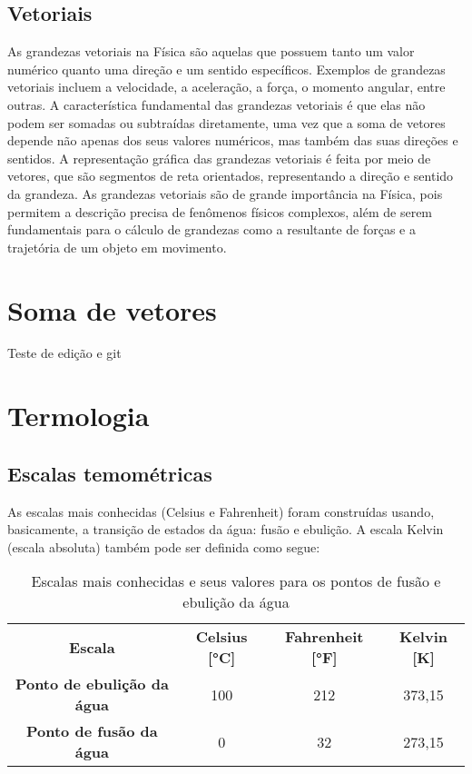 \subsection{Vetoriais}
As grandezas vetoriais na Física são aquelas que possuem tanto um valor numérico quanto uma direção e um sentido específicos. Exemplos de grandezas vetoriais incluem a velocidade, a aceleração, a força, o momento angular, entre outras. A característica fundamental das grandezas vetoriais é que elas não podem ser somadas ou subtraídas diretamente, uma vez que a soma de vetores depende não apenas dos seus valores numéricos, mas também das suas direções e sentidos. A representação gráfica das grandezas vetoriais é feita por meio de vetores, que são segmentos de reta orientados, representando a direção e sentido da grandeza. As grandezas vetoriais são de grande importância na Física, pois permitem a descrição precisa de fenômenos físicos complexos, além de serem fundamentais para o cálculo de grandezas como a resultante de forças e a trajetória de um objeto em movimento.


\section{Soma de vetores}
Teste de edição e git





\section{Termologia}
\subsection{Escalas temométricas}
As escalas mais conhecidas (Celsius e Fahrenheit) foram construídas usando, basicamente, a transição de estados da água: fusão e ebulição. A escala Kelvin (escala absoluta) também pode ser definida como segue:

\begin{table}[!h]
    \centering
    \caption{Escalas mais conhecidas e seus valores para os pontos de fusão e ebulição da água}
    \vspace{.5cm}
    \label{tab:my-table}
    \begin{tabular}{cccc}
    \textbf{Escala}                    & \textbf{Celsius {[}°C{]}} & \textbf{Fahrenheit {[}°F{]}} & \textbf{Kelvin {[}K{]}} \\
    \textbf{Ponto de ebulição da água} & 100                       & 212                          & 373,15                  \\
    \textbf{Ponto de fusão da água}    & 0                         & 32                           & 273,15                 
    \end{tabular}
\end{table}